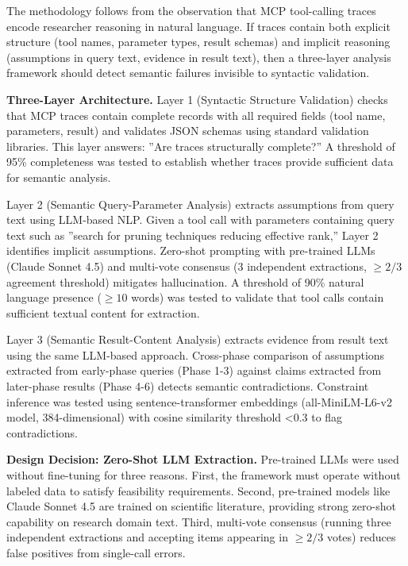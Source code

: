 
The methodology follows from the observation that MCP tool-calling traces encode researcher reasoning in natural language. If traces contain both explicit structure (tool names, parameter types, result schemas) and implicit reasoning (assumptions in query text, evidence in result text), then a three-layer analysis framework should detect semantic failures invisible to syntactic validation.

\textbf{Three-Layer Architecture.} Layer 1 (Syntactic Structure Validation) checks that MCP traces contain complete records with all required fields (tool name, parameters, result) and validates JSON schemas using standard validation libraries. This layer answers: ''Are traces structurally complete?'' A threshold of 95\% completeness was tested to establish whether traces provide sufficient data for semantic analysis.

Layer 2 (Semantic Query-Parameter Analysis) extracts assumptions from query text using LLM-based NLP. Given a tool call with parameters containing query text such as ''search for pruning techniques reducing effective rank,'' Layer 2 identifies implicit assumptions. Zero-shot prompting with pre-trained LLMs (Claude Sonnet 4.5) and multi-vote consensus (3 independent extractions, $\geq 2/3$ agreement threshold) mitigates hallucination. A threshold of 90\% natural language presence ($\geq 10$ words) was tested to validate that tool calls contain sufficient textual content for extraction.

Layer 3 (Semantic Result-Content Analysis) extracts evidence from result text using the same LLM-based approach. Cross-phase comparison of assumptions extracted from early-phase queries (Phase 1-3) against claims extracted from later-phase results (Phase 4-6) detects semantic contradictions. Constraint inference was tested using sentence-transformer embeddings (all-MiniLM-L6-v2 model, 384-dimensional) with cosine similarity threshold <0.3 to flag contradictions.

\textbf{Design Decision: Zero-Shot LLM Extraction.} Pre-trained LLMs were used without fine-tuning for three reasons. First, the framework must operate without labeled data to satisfy feasibility requirements. Second, pre-trained models like Claude Sonnet 4.5 are trained on scientific literature, providing strong zero-shot capability on research domain text. Third, multi-vote consensus (running three independent extractions and accepting items appearing in $\geq 2/3$ votes) reduces false positives from single-call errors.

